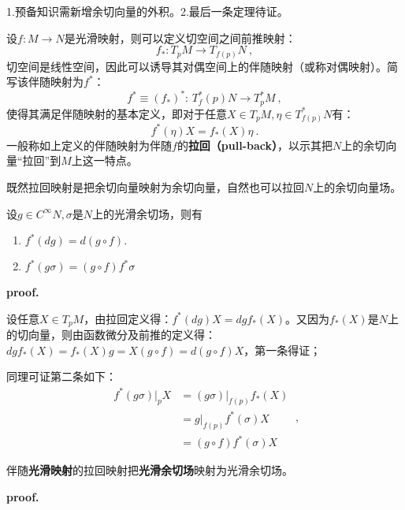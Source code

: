 

\begin{issues}
\issueDraft 
1.预备知识需新增余切向量的外积。2.最后一条定理待证。
\end{issues}

设$f:M\rightarrow N$是光滑映射，则可以定义切空间之间前推映射：
\begin{equation}
f_*: T_p M\rightarrow T_{f(p)}N~,
\end{equation}
切空间是线性空间，因此可以诱导其对偶空间上的伴随映射（或称对偶映射）。简写该伴随映射为$f^*$：
\begin{equation}
f^*\equiv(f_*)^*:\,T^*_f(p)N\rightarrow T_p^*M~,
\end{equation}
使得其满足伴随映射的基本定义，即对于任意$X\in T_p M,\eta\in T^*_{f(p)}N$有：
\begin{equation}
f^*(\eta)X=f_*(X)\eta~.
\end{equation}
一般称如上定义的伴随映射为伴随$f$的\textbf{拉回（pull-back）}，以示其把$N$上的余切向量“拉回”到$M$上这一特点。

既然拉回映射是把余切向量映射为余切向量，自然也可以拉回$N$上的余切向量场。
\begin{lemma}{}\label{lem_PullBk_1}
设$g\in C^{\infty }N,\sigma$是$N$上的光滑余切场，则有
\begin{enumerate}
\item $f^*(dg)=d(g\circ f).$
\item $f^*(g\sigma)=(g\circ f)f^*\sigma$
\end{enumerate}
\end{lemma}
\textbf{proof.}

设任意$X\in T_pM$，由拉回定义得：$f^*(dg)X=dgf_*(X)$。又因为$f_*(X)$是$N$上的切向量，则由函数微分及前推的定义得：$dgf_*(X)=f_*(X)g=X(g\circ f)=d(g\circ f)X$，第一条得证；

同理可证第二条如下：
\begin{equation}
\begin{aligned}
f^*(g\sigma)|_pX&=(g\sigma)|_{f(p)}f_*(X)\\
&=g|_{f(p)}f^*(\sigma)X\\
&=(g\circ f)f^*(\sigma)X
\end{aligned}
~,
\end{equation}

\begin{theorem}{}
伴随\textbf{光滑映射}的拉回映射把\textbf{光滑余切场}映射为光滑余切场。
\end{theorem}
\textbf{proof.}

